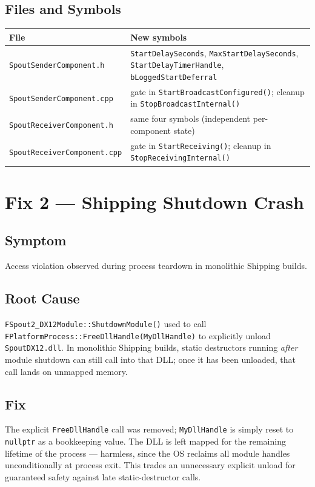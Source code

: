 \documentclass[11pt,a4paper]{article}
\begin{document}
\subsection{Files and Symbols}
\begin{center}
\begin{tabular}{@{}ll@{}}
\toprule
File & New symbols \\
\midrule
\texttt{SpoutSenderComponent.h} & \texttt{StartDelaySeconds},
    \texttt{MaxStartDelaySeconds}, \texttt{StartDelayTimerHandle},
    \texttt{bLoggedStartDeferral} \\
\texttt{SpoutSenderComponent.cpp} & gate in
    \texttt{StartBroadcastConfigured()}; cleanup in
    \texttt{StopBroadcastInternal()} \\
\texttt{SpoutReceiverComponent.h} & same four symbols (independent
    per-component state) \\
\texttt{SpoutReceiverComponent.cpp} & gate in \texttt{StartReceiving()};
    cleanup in \texttt{StopReceivingInternal()} \\
\bottomrule
\end{tabular}
\end{center}

\section{Fix 2 --- Shipping Shutdown Crash}
\label{sec:shutdown-crash}

\subsection{Symptom}
Access violation observed during process teardown in monolithic Shipping
builds.

\subsection{Root Cause}
\texttt{FSpout2\_DX12Module::ShutdownModule()} used to call
\texttt{FPlatformProcess::FreeDllHandle(MyDllHandle)} to explicitly unload
\texttt{SpoutDX12.dll}. In monolithic Shipping builds, static destructors
running \emph{after} module shutdown can still call into that DLL; once
it has been unloaded, that call lands on unmapped memory.

\subsection{Fix}
The explicit \texttt{FreeDllHandle} call was removed;
\texttt{MyDllHandle} is simply reset to \texttt{nullptr} as a bookkeeping
value. The DLL is left mapped for the remaining lifetime of the process ---
harmless, since the OS reclaims all module handles unconditionally at
process exit. This trades an unnecessary explicit unload for guaranteed
safety against late static-destructor calls.
\end{document}
